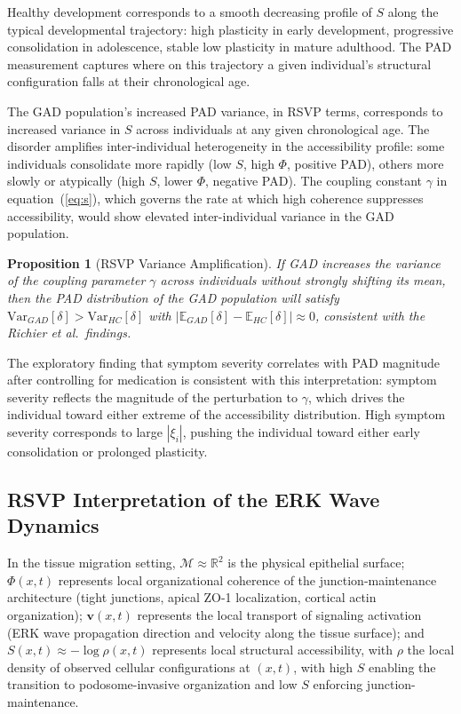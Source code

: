 \documentclass[11pt,a4paper]{article}
\theoremstyle{plain}
\newtheorem{proposition}[theorem]{Proposition}
\theoremstyle{definition}
\begin{document}
Healthy development corresponds to a smooth decreasing profile of $S$ along the typical
developmental trajectory: high plasticity in early development, progressive consolidation
in adolescence, stable low plasticity in mature adulthood. The PAD measurement captures
where on this trajectory a given individual's structural configuration falls at their
chronological age.

The GAD population's increased PAD variance, in RSVP terms, corresponds to increased
variance in $S$ across individuals at any given chronological age. The disorder amplifies
inter-individual heterogeneity in the accessibility profile: some individuals consolidate
more rapidly (low $S$, high $\Phi$, positive PAD), others more slowly or atypically
(high $S$, lower $\Phi$, negative PAD). The coupling constant $\gamma$ in
equation~(\ref{eq:s}), which governs the rate at which high coherence suppresses
accessibility, would show elevated inter-individual variance in the GAD population.

\begin{proposition}[RSVP Variance Amplification]
If GAD increases the variance of the coupling parameter $\gamma$ across individuals
without strongly shifting its mean, then the PAD distribution of the GAD population
will satisfy $\mathrm{Var}_{GAD}[\delta] > \mathrm{Var}_{HC}[\delta]$ with
$|\mathbb{E}_{GAD}[\delta] - \mathbb{E}_{HC}[\delta]| \approx 0$, consistent with
the Richier et al.\ findings.
\end{proposition}

The exploratory finding that symptom severity correlates with PAD magnitude after
controlling for medication is consistent with this interpretation: symptom severity
reflects the magnitude of the perturbation to $\gamma$, which drives the individual
toward either extreme of the accessibility distribution. High symptom severity
corresponds to large $|\xi_i|$, pushing the individual toward either early consolidation
or prolonged plasticity.

\subsection{RSVP Interpretation of the ERK Wave Dynamics}

In the tissue migration setting, $\mathcal{M} \approx \mathbb{R}^2$ is the physical
epithelial surface; $\Phi(x, t)$ represents local organizational coherence of the
junction-maintenance architecture (tight junctions, apical ZO-1 localization, cortical
actin organization); $\mathbf{v}(x, t)$ represents the local transport of signaling
activation (ERK wave propagation direction and velocity along the tissue surface); and
$S(x, t) \approx -\log\rho(x,t)$ represents local structural accessibility, with $\rho$
the local density of observed cellular configurations at $(x,t)$, with high $S$ enabling
the transition to podosome-invasive organization and low $S$ enforcing junction-maintenance.
\end{document}
